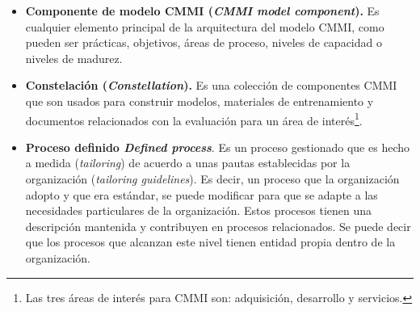 \begin{itemize}
\item \textbf{\hypertarget{componente}{Componente de modelo CMMI} (\textit{CMMI model component}).} Es cualquier elemento principal de la arquitectura del modelo CMMI, como pueden ser prácticas, objetivos, áreas de proceso, niveles de capacidad o niveles de madurez.
\item \textbf{Constelación (\textit{Constellation}).} Es una colección de componentes CMMI que son usados para construir modelos, materiales de entrenamiento y documentos relacionados con la evaluación para un área de interés\footnote{Las tres áreas de interés para CMMI son: adquisición, desarrollo y servicios.}.
\item \textbf{Proceso definido \textit{Defined process}}. Es un proceso gestionado que es hecho a medida (\textit{tailoring}) de acuerdo a unas pautas establecidas por la organización (\textit{tailoring guidelines}). Es decir, un proceso que la organización adopto y que era estándar, se puede modificar para que se adapte a las necesidades particulares de la organización. Estos procesos tienen una descripción mantenida y contribuyen en procesos relacionados. Se puede decir que los procesos que alcanzan este nivel tienen entidad propia dentro de la organización.



\end{itemize}
